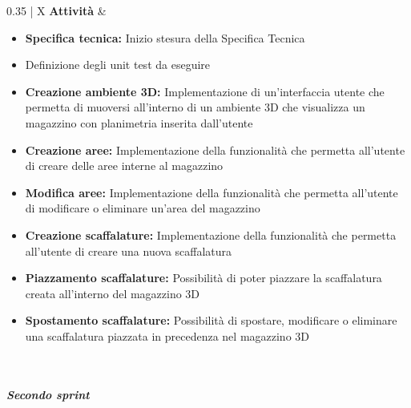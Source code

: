 \begin{xltabular}{\textwidth}{{0.35\textwidth} | X}
    \textbf{Attività} 
    & \begin{itemize}[topsep=0pt]
         \item \textbf{Specifica tecnica:} Inizio stesura della Specifica Tecnica
        \item Definizione degli unit test da eseguire
        \item \textbf{Creazione ambiente 3D:} Implementazione di un'interfaccia utente che permetta di muoversi all'interno di un ambiente 3D che visualizza un magazzino con planimetria inserita dall'utente
        \item \textbf{Creazione aree:} Implementazione della funzionalità che permetta all'utente di creare delle aree interne al magazzino
        \item \textbf{Modifica aree:} Implementazione della funzionalità che permetta all'utente di modificare o eliminare un'area del magazzino
        \item \textbf{Creazione scaffalature:} Implementazione della funzionalità che permetta all'utente di creare una nuova scaffalatura
        \item \textbf{Piazzamento scaffalature:} Possibilità di poter piazzare la scaffalatura creata all'interno del magazzino 3D
        \item \textbf{Spostamento scaffalature:} Possibilità di spostare, modificare o eliminare una scaffalatura piazzata in precedenza nel magazzino 3D
    \end{itemize} \\
    \hline

\caption{Tabella descrittiva dello sprint 1 della codifica del prodotto finale}
\end{xltabular}

\subparagraph{Secondo sprint}\label{sec:pianificazione:codificaPB:periodi:secondo}

